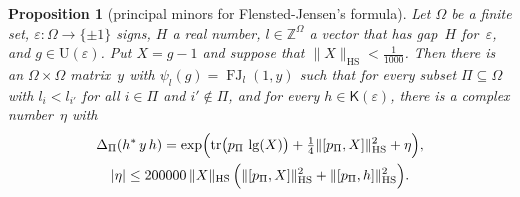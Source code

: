 \documentclass[11pt,a4paper]{article}
\newcommand{\m}[1]{\mbox{$#1$}}        %
\theoremstyle{plainx}
\newtheorem{proposition}[theorem]{Proposition}
\theoremstyle{uprightx}
\newcommand{\ZZ}{\mathbb{Z}}
\newcommand{\abs}[1]{\lvert #1\rvert}
\newcommand{\hs}[1]{\lVert #1\rVert_{\mathrm{HS}}}
\newcommand{\tr}{\operatorname{tr}}
\newcommand{\comm}[2]{[#1,#2]}
\newcommand{\Us}[1]{\mathrm{U}(#1)}                      %
\newcommand{\Ks}[1]{\mathsf{K}(#1)}                      %
\newcommand{\lgo}[1]{\operatorname{lg}(#1)}              %
\newcommand{\cpr}[1]{p_{#1}}                             %
\newcommand{\pmn}[2]{\Delta_{#1}(#2)}                    %
\newcommand{\dsc}[2]{\psi_{#1}(#2)}                      %
\newcommand{\fj}[3]{\operatorname{FJ}_{#1}(#2,#3)}       %
\begin{document}
\begin{proposition}[principal minors for Flensted-Jensen's formula]\label{p:minors}
Let $\Omega$ be a finite set, $\varepsilon\colon\Omega\to\{\pm1\}$ signs, $H$ a real number, \m{l\in\ZZ^{\Omega}} a
vector that has gap~$H$ for~$\varepsilon$, and \m{g\in\Us{\varepsilon}}. Put \m{X=g-1} and suppose that
\m{\hs{X}<\tfrac1{1000}}. Then there is an \m{\Omega\times\Omega} matrix~$y$ with \m{\dsc{l}{g}=\fj{l}{1}{y}} such that
for every subset \m{\Pi\subseteq\Omega} with \m{l_i<l_{i'}} for all \m{i\in\Pi} and \m{i'\notin\Pi}, and for every
\m{h\in\Ks{\varepsilon}}, there is a complex number~$\eta$ with
\begin{gather*}
\pmn{\Pi}{h^{*}\,y\,h}=\exp\Bigl(\tr\bigl(\cpr{\Pi}\,\lgo{X}\bigr)+\tfrac14\hs{\comm{\cpr{\Pi}}{X}}^{2}+\eta\Bigr),\\
\abs{\eta}\le200000\,\hs{X}\,\Bigl(\hs{\comm{\cpr{\Pi}}{X}}^{2}+\hs{\comm{\cpr{\Pi}}{h}}^{2}\Bigr).
\end{gather*}
\end{proposition}
\end{document}
